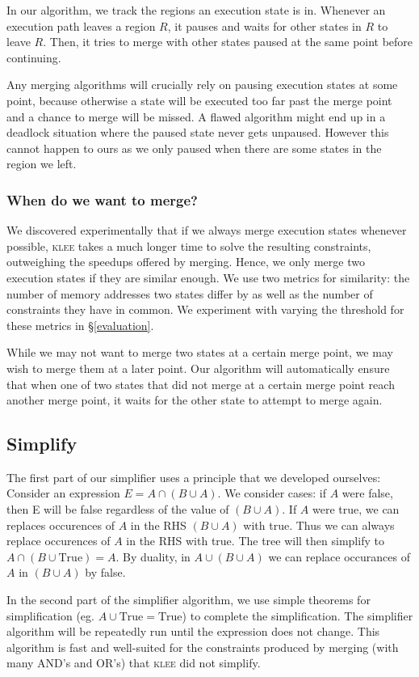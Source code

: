 \documentclass[12pt,a4paper]{article}
\newcommand{\klee}{\textsc{klee }}
\begin{document}
In our algorithm, we track the regions an execution state is in. Whenever an execution path leaves a region $R$, it pauses and waits for other states in $R$ to leave $R$. Then, it tries to merge with other states paused at the same point before continuing. 

Any merging algorithms will crucially rely on pausing execution states at some point, because otherwise a state will be executed too far past the merge point and a chance to merge will be missed. A flawed algorithm might end up in a deadlock situation where the paused state never gets unpaused. However this cannot happen to ours as we only paused when there are some states in the region we left.

\subsubsection{When do we want to merge?}
We discovered experimentally that if we always merge execution states whenever possible, \klee takes a much longer time to solve the resulting constraints, outweighing the speedups offered by merging. Hence, we only merge two execution states if they are similar enough. We use two metrics for similarity: the number of memory addresses two states differ by as well as the number of constraints they have in common. We experiment with varying the threshold for these metrics in \S\ref{evaluation}.

While we may not want to merge two states at a certain merge point, we may wish to merge them at a later point. Our algorithm will automatically ensure that when one of two states that did not merge at a certain merge point reach another merge point, it waits for the other state to attempt to merge again.

\subsection{Simplify}
The first part of our simplifier uses a principle that we developed ourselves:
Consider an expression $E = A\cap(B\cup A)$. We consider cases: if $A$ were false, then E will be false regardless of the value of $(B\cup A)$. If $A$ were true, we can replaces occurences of $A$ in the RHS $(B\cup A)$ with true. Thus we can always replace occurences of $A$ in the RHS with true. The tree will then simplify to $A\cap(B\cup \text{True}) = A$. By duality, in $A\cup(B\cup A)$ we can replace occurances of $A$ in $(B\cup A)$ by false.

In the second part of the simplifier algorithm, we use simple theorems for simplification (eg. $A\cup \text{True} = \text{True}$) to complete the simplification. The simplifier algorithm will be repeatedly run until the expression does not change. This algorithm is fast and well-suited for the constraints produced by merging (with many AND's and OR's) that \klee did not simplify.
\end{document}
